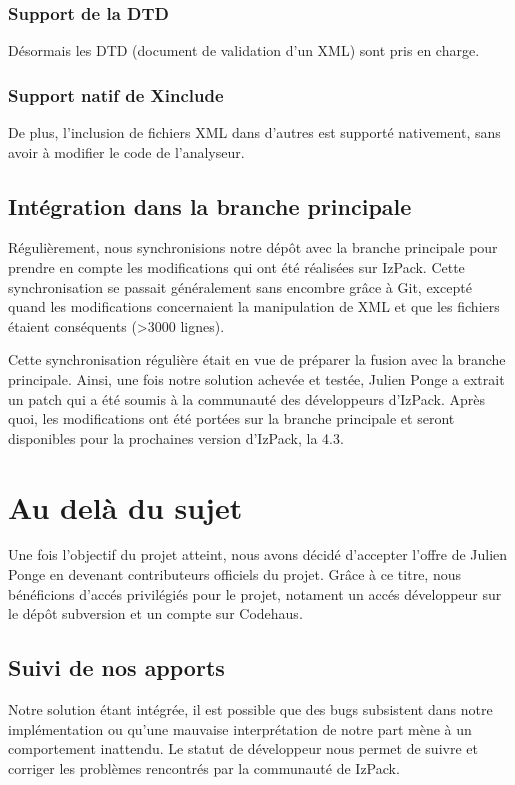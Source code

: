 \subsubsection{Support de la DTD}
Désormais les DTD (document de validation d'un XML) sont pris en charge.
\subsubsection{Support natif de Xinclude}
De plus, l'inclusion de fichiers XML dans d'autres est supporté nativement, sans avoir à modifier le code de l'analyseur.
\subsection{Intégration dans la branche principale}
Régulièrement, nous synchronisions notre dépôt avec la branche principale pour prendre en compte les modifications qui ont été réalisées sur IzPack.
Cette synchronisation se passait généralement sans encombre grâce à Git, excepté quand les modifications concernaient la manipulation de XML et que les fichiers étaient conséquents (>3000 lignes).

Cette synchronisation régulière était en vue de préparer la fusion avec la branche principale.
Ainsi, une fois notre solution achevée et testée, Julien Ponge a extrait un patch qui a été soumis à la communauté des développeurs d'IzPack.
Après quoi, les modifications ont été portées sur la branche principale et seront disponibles pour la prochaines version d'IzPack, la 4.3.

\section{Au delà du sujet}
Une fois l'objectif du projet atteint, nous avons décidé d'accepter l'offre de Julien Ponge en devenant contributeurs officiels du projet.
Grâce à ce titre, nous bénéficions d'accés privilégiés pour le projet, notament un accés développeur sur le dépôt subversion et un compte sur Codehaus.
\subsection{Suivi de nos apports}
Notre solution étant intégrée, il est possible que des bugs subsistent dans notre implémentation ou qu'une mauvaise interprétation de notre part mène à un comportement inattendu.
Le statut de développeur nous permet de suivre et corriger les problèmes rencontrés par la communauté de IzPack.
